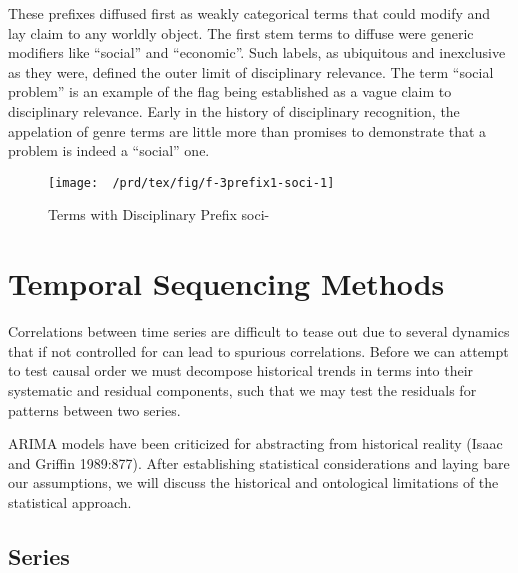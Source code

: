 These prefixes diffused first as weakly categorical terms that could
modify and lay claim to any worldly object. The first stem terms to
diffuse were generic modifiers like ``social'' and ``economic''. Such
labels, as ubiquitous and inexclusive as they were, defined the outer
limit of disciplinary relevance. The term ``social problem'' is an
example of the flag being established as a vague claim to disciplinary
relevance. Early in the history of disciplinary recognition, the
appelation of genre terms are little more than promises to demonstrate
that a problem is indeed a ``social'' one.

\begin{figure}

{\centering \texttt{[image: ~/prd/tex/fig/f-3prefix1-soci-1]} 

}

\caption[Terms with Disciplinary Prefix soci-]{Terms with Disciplinary Prefix soci-}\label{fig:f-3prefix1-soci}
\end{figure}

\section{Temporal Sequencing Methods}\label{temporal-sequencing-methods}

Correlations between time series are difficult to tease out due to
several dynamics that if not controlled for can lead to spurious
correlations. Before we can attempt to test causal order we must
decompose historical trends in terms into their systematic and residual
components, such that we may test the residuals for patterns between two
series.

ARIMA models have been criticized for abstracting from historical
reality (Isaac and Griffin 1989:877). After establishing statistical
considerations and laying bare our assumptions, we will discuss the
historical and ontological limitations of the statistical approach.

\subsection{Series}\label{series}


